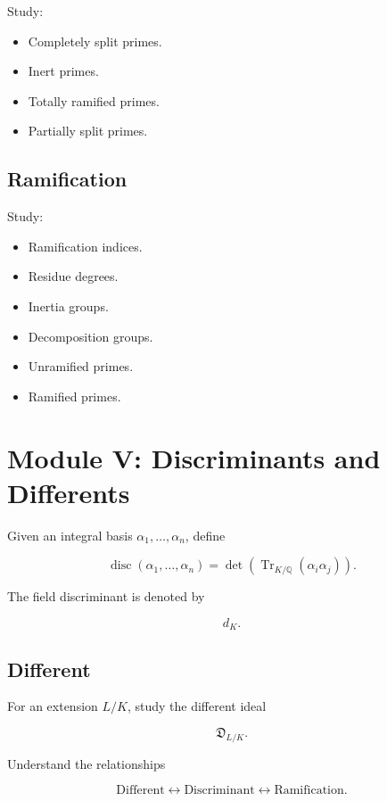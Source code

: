\documentclass[11pt]{article}
\begin{document}
Study:

\begin{itemize}
    \item Completely split primes.
    \item Inert primes.
    \item Totally ramified primes.
    \item Partially split primes.
\end{itemize}

\subsection{Ramification}

Study:

\begin{itemize}
    \item Ramification indices.
    \item Residue degrees.
    \item Inertia groups.
    \item Decomposition groups.
    \item Unramified primes.
    \item Ramified primes.
\end{itemize}

\section{Module V: Discriminants and Differents}

Given an integral basis
$\alpha_1,\ldots,\alpha_n$, define

\[
\operatorname{disc}
(\alpha_1,\ldots,\alpha_n)
=
\det
\left(
\operatorname{Tr}_{K/\mathbb{Q}}
(\alpha_i\alpha_j)
\right).
\]

The field discriminant is denoted by

\[
d_K.
\]

\subsection{Different}

For an extension $L/K$, study the different ideal

\[
\mathfrak{D}_{L/K}.
\]

Understand the relationships

\[
\boxed{
\text{Different}
\longleftrightarrow
\text{Discriminant}
\longleftrightarrow
\text{Ramification}.
}
\]
\end{document}
